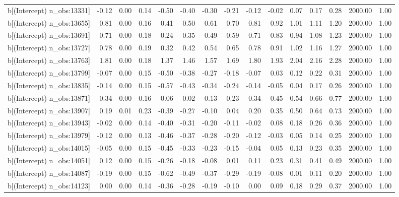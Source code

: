 \begin{table}[ht]
\begin{tabular}{rrrrrrrrrrrrrrr}
  b[(Intercept) n\_obs:13331] & -0.12 & 0.00 & 0.14 & -0.50 & -0.40 & -0.30 & -0.21 & -0.12 & -0.02 & 0.07 & 0.17 & 0.28 & 2000.00 & 1.00 \\ 
  b[(Intercept) n\_obs:13655] & 0.81 & 0.00 & 0.16 & 0.41 & 0.50 & 0.61 & 0.70 & 0.81 & 0.92 & 1.01 & 1.11 & 1.20 & 2000.00 & 1.00 \\ 
  b[(Intercept) n\_obs:13691] & 0.71 & 0.00 & 0.18 & 0.24 & 0.35 & 0.49 & 0.59 & 0.71 & 0.83 & 0.94 & 1.08 & 1.23 & 2000.00 & 1.00 \\ 
  b[(Intercept) n\_obs:13727] & 0.78 & 0.00 & 0.19 & 0.32 & 0.42 & 0.54 & 0.65 & 0.78 & 0.91 & 1.02 & 1.16 & 1.27 & 2000.00 & 1.00 \\ 
  b[(Intercept) n\_obs:13763] & 1.81 & 0.00 & 0.18 & 1.37 & 1.46 & 1.57 & 1.69 & 1.80 & 1.93 & 2.04 & 2.16 & 2.28 & 2000.00 & 1.00 \\ 
  b[(Intercept) n\_obs:13799] & -0.07 & 0.00 & 0.15 & -0.50 & -0.38 & -0.27 & -0.18 & -0.07 & 0.03 & 0.12 & 0.22 & 0.31 & 2000.00 & 1.00 \\ 
  b[(Intercept) n\_obs:13835] & -0.14 & 0.00 & 0.15 & -0.57 & -0.43 & -0.34 & -0.24 & -0.14 & -0.05 & 0.04 & 0.17 & 0.26 & 2000.00 & 1.00 \\ 
  b[(Intercept) n\_obs:13871] & 0.34 & 0.00 & 0.16 & -0.06 & 0.02 & 0.13 & 0.23 & 0.34 & 0.45 & 0.54 & 0.66 & 0.77 & 2000.00 & 1.00 \\ 
  b[(Intercept) n\_obs:13907] & 0.19 & 0.01 & 0.23 & -0.39 & -0.27 & -0.10 & 0.04 & 0.20 & 0.35 & 0.50 & 0.64 & 0.73 & 2000.00 & 1.00 \\ 
  b[(Intercept) n\_obs:13943] & -0.02 & 0.00 & 0.14 & -0.40 & -0.31 & -0.20 & -0.11 & -0.02 & 0.08 & 0.18 & 0.26 & 0.36 & 2000.00 & 1.00 \\ 
  b[(Intercept) n\_obs:13979] & -0.12 & 0.00 & 0.13 & -0.46 & -0.37 & -0.28 & -0.20 & -0.12 & -0.03 & 0.05 & 0.14 & 0.25 & 2000.00 & 1.00 \\ 
  b[(Intercept) n\_obs:14015] & -0.05 & 0.00 & 0.15 & -0.45 & -0.33 & -0.23 & -0.15 & -0.04 & 0.05 & 0.13 & 0.23 & 0.35 & 2000.00 & 1.00 \\ 
  b[(Intercept) n\_obs:14051] & 0.12 & 0.00 & 0.15 & -0.26 & -0.18 & -0.08 & 0.01 & 0.11 & 0.23 & 0.31 & 0.41 & 0.49 & 2000.00 & 1.00 \\ 
  b[(Intercept) n\_obs:14087] & -0.19 & 0.00 & 0.15 & -0.62 & -0.49 & -0.37 & -0.29 & -0.19 & -0.08 & 0.01 & 0.11 & 0.20 & 2000.00 & 1.00 \\ 
  b[(Intercept) n\_obs:14123] & 0.00 & 0.00 & 0.14 & -0.36 & -0.28 & -0.19 & -0.10 & 0.00 & 0.09 & 0.18 & 0.29 & 0.37 & 2000.00 & 1.00 \\ 

\end{tabular}
\end{table}
